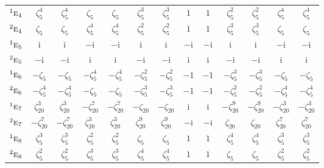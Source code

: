 \documentclass[10pt,a4paper]{article}
\numberwithin{equation}{section}
\newcommand{\irr}[1]{\text{\normalfont\scshape #1}}
\newcommand{\conjpair}[1]{{}^{#1}}
\newcommand{\iunit}{\mathrm{i}}
\newcommand{\rootunity}[1]{\zeta_{#1}}
\begin{document}
{\begin{longtable}{@{}lcccccccccccc@{}}
$\conjpair{1}\irr{e}_{4}$ & $\rootunity{5}^{4}$ & $\rootunity{5}^{4}$ & $\rootunity{5}$ & $\rootunity{5}$ & $\rootunity{5}^{3}$ & $\rootunity{5}^{3}$ & $1$ & $1$ & $\rootunity{5}^{2}$ & $\rootunity{5}^{2}$ & $\rootunity{5}^{4}$ & $\rootunity{5}^{4}$\\
$\conjpair{2}\irr{e}_{4}$ & $\rootunity{5}$ & $\rootunity{5}$ & $\rootunity{5}^{4}$ & $\rootunity{5}^{4}$ & $\rootunity{5}^{2}$ & $\rootunity{5}^{2}$ & $1$ & $1$ & $\rootunity{5}^{3}$ & $\rootunity{5}^{3}$ & $\rootunity{5}$ & $\rootunity{5}$\\
$\conjpair{1}\irr{e}_{5}$ & $\iunit{}$ & $\iunit{}$ & $-\iunit{}$ & $-\iunit{}$ & $\iunit{}$ & $\iunit{}$ & $-\iunit{}$ & $-\iunit{}$ & $\iunit{}$ & $\iunit{}$ & $-\iunit{}$ & $-\iunit{}$\\
$\conjpair{2}\irr{e}_{5}$ & $-\iunit{}$ & $-\iunit{}$ & $\iunit{}$ & $\iunit{}$ & $-\iunit{}$ & $-\iunit{}$ & $\iunit{}$ & $\iunit{}$ & $-\iunit{}$ & $-\iunit{}$ & $\iunit{}$ & $\iunit{}$\\
$\conjpair{1}\irr{e}_{6}$ & $-\rootunity{5}$ & $-\rootunity{5}$ & $-\rootunity{5}^{4}$ & $-\rootunity{5}^{4}$ & $-\rootunity{5}^{2}$ & $-\rootunity{5}^{2}$ & $-1$ & $-1$ & $-\rootunity{5}^{3}$ & $-\rootunity{5}^{3}$ & $-\rootunity{5}$ & $-\rootunity{5}$\\
$\conjpair{2}\irr{e}_{6}$ & $-\rootunity{5}^{4}$ & $-\rootunity{5}^{4}$ & $-\rootunity{5}$ & $-\rootunity{5}$ & $-\rootunity{5}^{3}$ & $-\rootunity{5}^{3}$ & $-1$ & $-1$ & $-\rootunity{5}^{2}$ & $-\rootunity{5}^{2}$ & $-\rootunity{5}^{4}$ & $-\rootunity{5}^{4}$\\
$\conjpair{1}\irr{e}_{7}$ & $\rootunity{20}^{3}$ & $\rootunity{20}^{3}$ & $-\rootunity{20}^{7}$ & $-\rootunity{20}^{7}$ & $-\rootunity{20}$ & $-\rootunity{20}$ & $\iunit{}$ & $\iunit{}$ & $-\rootunity{20}^{9}$ & $-\rootunity{20}^{9}$ & $-\rootunity{20}^{3}$ & $-\rootunity{20}^{3}$\\
$\conjpair{2}\irr{e}_{7}$ & $-\rootunity{20}^{7}$ & $-\rootunity{20}^{7}$ & $\rootunity{20}^{3}$ & $\rootunity{20}^{3}$ & $\rootunity{20}^{9}$ & $\rootunity{20}^{9}$ & $-\iunit{}$ & $-\iunit{}$ & $\rootunity{20}$ & $\rootunity{20}$ & $\rootunity{20}^{7}$ & $\rootunity{20}^{7}$\\
$\conjpair{1}\irr{e}_{8}$ & $\rootunity{5}^{3}$ & $\rootunity{5}^{3}$ & $\rootunity{5}^{2}$ & $\rootunity{5}^{2}$ & $\rootunity{5}$ & $\rootunity{5}$ & $1$ & $1$ & $\rootunity{5}^{4}$ & $\rootunity{5}^{4}$ & $\rootunity{5}^{3}$ & $\rootunity{5}^{3}$\\
$\conjpair{2}\irr{e}_{8}$ & $\rootunity{5}^{2}$ & $\rootunity{5}^{2}$ & $\rootunity{5}^{3}$ & $\rootunity{5}^{3}$ & $\rootunity{5}^{4}$ & $\rootunity{5}^{4}$ & $1$ & $1$ & $\rootunity{5}$ & $\rootunity{5}$ & $\rootunity{5}^{2}$ & $\rootunity{5}^{2}$\\

\end{longtable}}
\end{document}
